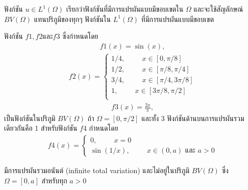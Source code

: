 \hspace{1cm}ฟังก์ชัน $u \in L^1 (\Omega)$ เรียกว่าฟังก์ชันที่มีการแปรผันแบบมีขอบเขตใน $\Omega$ และจะใช้สัญลักษณ์ $BV(\Omega)$ แทนปริภูมิของทุกๆ ฟังก์ชันใน $L^1(\Omega)$ ที่มีการแปรผันแบบมีขอบเขต
\begin{Example}
    ฟังก์ชัน $f1, f2 \text{และ} f3 $ ซึ่งกำหนดโดย
    \begin{align}
        f1(x) = \sin{(x)},
    \end{align}
    \begin{align}
        f2(x) = \left\{
            \begin{array}{ll}
              1/4, \hspace{1cm}  x \in [0,\pi/8] \\
              1/2, \hspace{1cm}  x \in [\pi/8,\pi/4] \\
              3/4, \hspace{1cm}  x \in [\pi/4,3\pi/8] \\
              1, \hspace{1cm}  x \in [3\pi/8,\pi/2] \\
            \end{array}
          \right.
    \end{align}
    \begin{align}
        f3(x) = \frac{2x}{\pi},
    \end{align}
    เป็นฟังก์ชันในปริภูมิ $BV(\Omega)$ ถ้า $\Omega = [0, \pi/2]$ และทั้ง 3 ฟังก์ชันด้านบนการแปรผันรวมเดียวกันคือ 1 สำหรับฟังก์ชัน $f4$ กำหนดโดย
    \begin{align}
        f4(x) = \left\{ 
            \begin{array}{ll}
                0, \hspace{1cm}  x = 0 \\
                \sin (1/x), \hspace{1cm} x \in (0,a) \text{ และ } a > 0
            \end{array}
        \right.
    \end{align}
    
    มีการแปรผันรวมอนันต์ (infinite total variation) และไม่อยู่ในปริภูมิ $BV(\Omega)$ ซึ่ง $\Omega = [0,a]$ สำหรับทุก $a > 0$
    
\end{Example}
